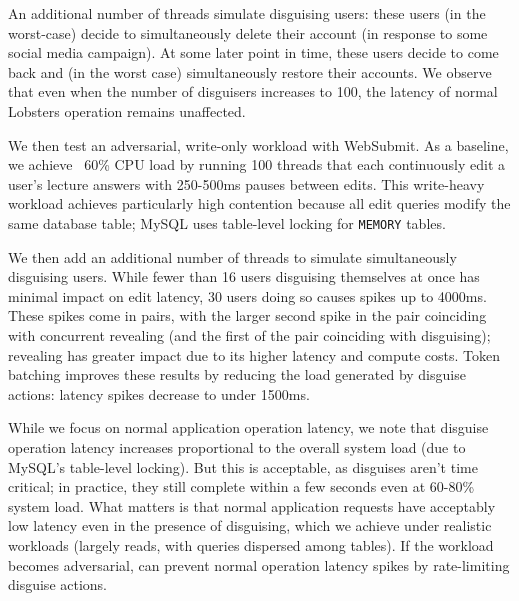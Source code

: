 An additional number of threads simulate disguising users: these users (in the worst-case) decide to
simultaneously delete their account (\eg in response to some social media campaign). At some later
point in time, these users decide to come back and (in the worst case) simultaneously restore their
accounts.
We observe that even when the number of disguisers increases to 100, the latency of normal Lobsters
operation remains unaffected.  

We then test an adversarial, write-only workload with WebSubmit. As a baseline, we achieve ~60\% CPU
load by running 100 threads that each continuously edit a user's lecture answers with 250-500ms
pauses between edits. This write-heavy workload achieves particularly high contention because all
edit queries modify the same database table; MySQL uses table-level locking for \texttt{MEMORY}
tables.

We then add an additional number of threads to simulate simultaneously disguising users.  While
fewer than 16 users disguising themselves at once has minimal impact on edit latency, 30 users doing
so causes spikes up to 4000ms.  These spikes come in pairs, with the larger second spike in the pair
coinciding with concurrent revealing (and the first of the pair coinciding with disguising);
revealing has greater impact due to its higher latency and compute costs.
%
Token batching improves these results by reducing the load generated by disguise actions: latency
spikes decrease to under 1500ms.

While we focus on normal application operation latency, we note that 
disguise operation latency increases proportional to the overall system load (\eg due to MySQL’s
table-level locking). But this is acceptable, as disguises aren't time critical; in practice, they
still complete within a few seconds even at 60-80\% system load. 
%
What matters is that normal application requests have acceptably low latency even in the presence of
disguising, which we achieve under realistic workloads (largely reads, with queries dispersed among
tables). If the workload becomes adversarial, \sys can prevent normal operation latency spikes by
rate-limiting disguise actions.
